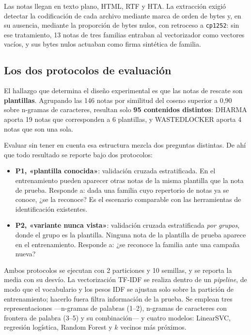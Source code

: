 \documentclass[11pt,a4paper]{article}
\begin{document}
Las notas llegan en texto plano, HTML, RTF y HTA. La extracción exigió detectar la
codificación de cada archivo mediante marca de orden de bytes y, en su ausencia, mediante la
proporción de bytes nulos, con retroceso a \texttt{cp1252}: sin ese tratamiento, 13 notas de
tres familias entraban al vectorizador como vectores vacíos, y sus bytes nulos actuaban como
firma sintética de familia.

\subsection{Los dos protocolos de evaluación}
\label{sec:protocolos}

El hallazgo que determina el diseño experimental es que las notas de rescate son
\textbf{plantillas}. Agrupando las 146 notas por similitud del coseno superior a 0,90 sobre
n-gramas de caracteres, resultan solo \textbf{95 contenidos distintos}: DHARMA aporta 19 notas
que corresponden a 6 plantillas, y WASTEDLOCKER aporta 4 notas que son una sola.

Evaluar sin tener en cuenta esa estructura mezcla dos preguntas distintas. De ahí que todo
resultado se reporte bajo dos protocolos:

\begin{itemize}
\item \textbf{P1, «plantilla conocida»}: validación cruzada estratificada. En el entrenamiento
pueden aparecer otras notas de la misma plantilla que la nota de prueba. Responde a: dada una
familia cuyo repertorio de notas ya se conoce, ¿se la reconoce? Es el escenario comparable con
las herramientas de identificación existentes.
\item \textbf{P2, «variante nunca vista»}: validación cruzada estratificada \emph{por grupos},
donde el grupo es la plantilla. Ninguna nota de la plantilla de prueba aparece en el
entrenamiento. Responde a: ¿se reconoce la familia ante una campaña nueva?
\end{itemize}

Ambos protocolos se ejecutan con 2 particiones y 10 semillas, y se reporta la media con su
desvío. La vectorización TF-IDF se realiza dentro de un \emph{pipeline}, de modo que el
vocabulario y los pesos IDF se ajustan solo sobre la partición de entrenamiento; hacerlo
fuera filtra información de la prueba. Se emplean tres representaciones ---n-gramas de
palabras (1--2), n-gramas de caracteres con frontera de palabra (3--5) y su combinación--- y
cuatro modelos: LinearSVC, regresión logística, Random Forest y $k$ vecinos más próximos.
\end{document}
